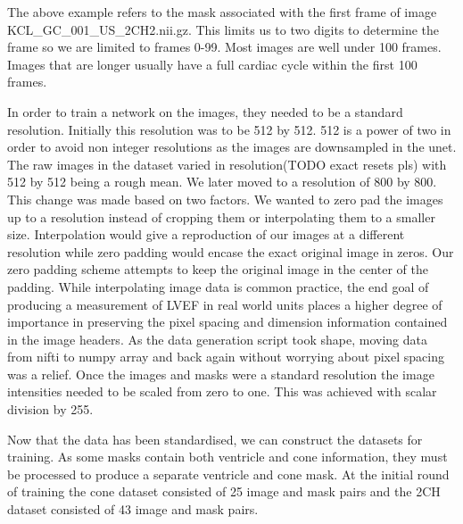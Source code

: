\documentclass[12pt]{article}
\begin{document}
The above example refers to the mask associated with the first frame of image KCL\_GC\_001\_US\_2CH2.nii.gz.
This limits us to two digits to determine the frame so we are limited to frames 0-99.
Most images are well under 100 frames. Images that are longer usually have a full cardiac cycle within the first 100 frames.
\par
In order to train a network on the images, they needed to be a standard resolution.
Initially this resolution was to be 512 by 512. 512 is a power of two in order to avoid non integer resolutions as the images are downsampled in the unet.
The raw images in the dataset varied in resolution(TODO exact resets pls) with 512 by 512 being a rough mean.
We later moved to a resolution of 800 by 800. This change was made based on two factors. 
We wanted to zero pad the images up to a resolution instead of cropping them or interpolating them to a smaller size.
Interpolation would give a reproduction of our images at a different resolution  while zero padding would encase the exact original image in zeros.
Our zero padding scheme attempts to keep the original image in the center of the padding.
While interpolating image data is common practice, the end goal of producing a measurement of LVEF in real world units places a higher degree of importance in preserving the pixel spacing and dimension information contained in the image headers.
As the data generation script took shape, moving data from nifti to numpy array and back again without worrying about pixel spacing was a relief.
Once the images and masks were a standard resolution the image intensities needed to be scaled from zero to one. This was achieved with scalar division by 255.
\par
Now that the data has been standardised, we can construct the datasets for training.
As some masks contain both ventricle and cone information, they must be processed to produce a separate ventricle and cone mask.
At the initial round of training the cone dataset consisted of 25 image and mask pairs and the 2CH dataset consisted of 43 image and mask pairs.

\par
\end{document}
